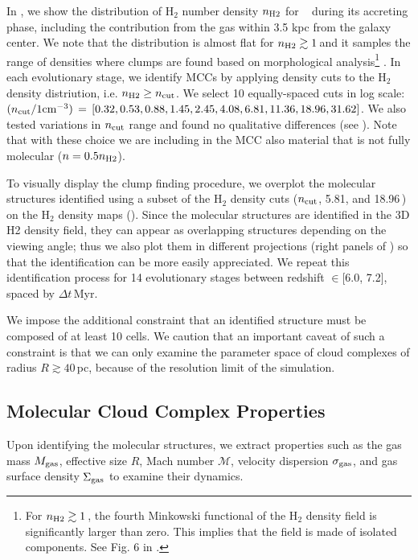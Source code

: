 \IfFileExists{emulateapjlegacy.cls}{\documentclass[iop]{emulateapjlegacy}}{\documentclass[iop]{emulateapj}}
\begin{document}
In , we show the distribution of H$_2$ number density $n_{\rm H2}$ for \flower~ during its accreting phase, including the contribution from the gas within 3.5 kpc from the galaxy center. 
%
We note that the distribution is almost flat for $n_{\rm H2}\gtrsim1$\,\cc and it samples the range of densities where clumps are found based on morphological analysis\footnote{For $n_{\rm H2}\gtrsim1$\,\cc, the fourth Minkowski functional of the H$_{2}$ density field is significantly larger than zero. This implies that the field is made of isolated components. See Fig. 6 in \citet{Pallottini17b}.} \citep{Pallottini17b}.
%
In each evolutionary stage, we identify MCCs by applying density cuts to the H$_2$ density distriution, i.e. $n_{\rm H2}\geq n_{\rm cut}$. We select 10 equally-spaced cuts in log scale: ${(n_{\rm cut}/{1 {\rm cm}^{-3})}}\,=\,[0.32, 0.53, 0.88, 1.45, 2.45, 4.08, 6.81, 11.36, 18.96, 31.62]$. We also tested variations in $n_{\rm cut}$ range and found no qualitative differences (see ). Note that with these choice we are including in the MCC also material that is not fully molecular ($n = 0.5 n_{\rm H2}$).

To visually display the clump finding procedure, we overplot the molecular structures identified using a subset of the H$_2$ density cuts ($n_{\rm cut}$, 5.81, and 18.96\,\cc) on the H$_2$ density maps (). Since the molecular structures are identified in the 3D H2 density field, they can appear as overlapping structures depending on the viewing angle; thus we also plot them in different projections (right panels of ) so that the identification can be more easily appreciated.
%
We repeat this identification process for 14 evolutionary stages between redshift \z$\in$[6.0, 7.2], spaced by $\Delta t$\,Myr.

We impose the additional constraint that an identified structure must be composed of at least 10 cells. We caution that an important caveat of such a constraint is that we can only examine the parameter space of cloud complexes of radius $R\gtrsim 40$\,pc, because of the resolution limit of the simulation.

\subsection{Molecular Cloud Complex Properties} \label{sec:distribution}

Upon identifying the molecular structures, we extract properties such as the gas mass $M_{\rm gas}$, effective size $R$, Mach number
$\mathcal{M}$, velocity dispersion $\sigma_{\rm gas}$, and gas surface density $\Sigma_{\rm gas}$ to examine their dynamics.
\end{document}
